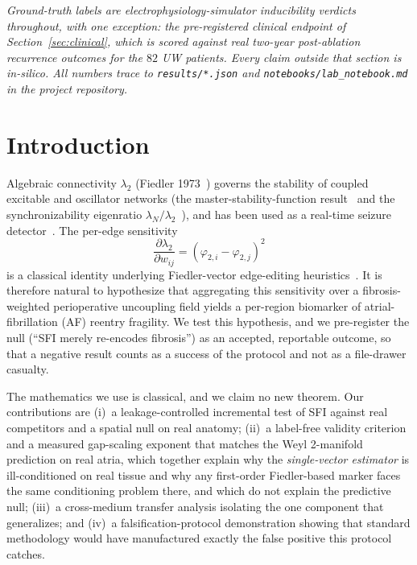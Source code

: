 \documentclass[11pt]{article}
\theoremstyle{definition}
\newcommand{\lam}{\lambda}
\newcommand{\phii}{\varphi}
\newcommand{\code}[1]{\texttt{#1}}
\begin{document}
\medskip
\noindent\emph{Ground-truth labels are electrophysiology-simulator inducibility
verdicts throughout, with one exception: the pre-registered clinical endpoint of
Section~\ref{sec:clinical}, which is scored against real two-year
post-ablation recurrence outcomes for the $82$ UW patients. Every claim outside
that section is in-silico. All numbers trace to \code{results/*.json} and
\code{notebooks/lab\_notebook.md} in the project repository.}

\tableofcontents

\section{Introduction}
Algebraic connectivity $\lam_2$ (Fiedler 1973~\cite{fiedler1973}) governs the
stability of coupled excitable and oscillator networks (the
master-stability-function result~\cite{pecora1998} and the synchronizability
eigenratio $\lam_N/\lam_2$~\cite{barahona2002}), and has been used as a
real-time seizure detector~\cite{bomela2020}. The per-edge sensitivity
\begin{equation}
\frac{\partial\lam_2}{\partial w_{ij}}=(\phii_{2,i}-\phii_{2,j})^2
\label{eq:edge}
\end{equation}
is a classical identity underlying Fiedler-vector edge-editing
heuristics~\cite{ghosh2006}. It is therefore natural to hypothesize that
aggregating this sensitivity over a fibrosis-weighted perioperative uncoupling
field yields a per-region biomarker of atrial-fibrillation (AF) reentry
fragility. We test this hypothesis, and we pre-register the null
(``SFI merely re-encodes fibrosis'') as an accepted, reportable outcome, so
that a negative result counts as a success of the protocol and not as a
file-drawer casualty.

The mathematics we use is classical, and we claim no new theorem. Our
contributions are
(i)~a leakage-controlled incremental test of SFI against real competitors and a
spatial null on real anatomy; (ii)~a label-free validity criterion and a
measured gap-scaling exponent that
matches the Weyl 2-manifold prediction on real atria, which together explain why
the \emph{single-vector estimator} is ill-conditioned on real tissue and why any
first-order Fiedler-based marker faces the same conditioning problem there, and
which do not explain the predictive null; (iii)~a cross-medium transfer analysis
isolating the one
component that generalizes; and (iv)~a falsification-protocol demonstration
showing that standard methodology would have manufactured exactly the false
positive this protocol catches.
\end{document}
